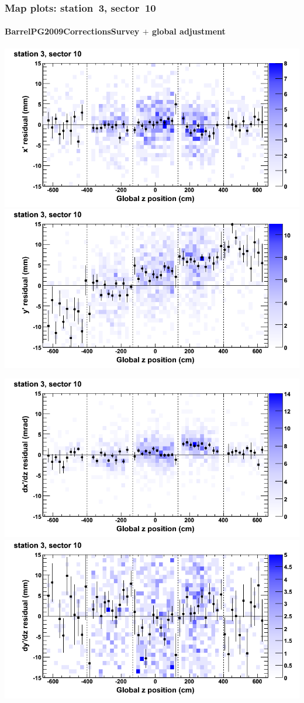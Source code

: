 \documentclass[compress]{beamer}
\begin{document}
\begin{frame}
\frametitle{Map plots: station~3, sector~10}
\framesubtitle{BarrelPG2009CorrectionsSurvey $+$ global adjustment}
\includegraphics[width=0.5\linewidth]{mapplots_re01/DTvsz_st3sec10_x.png}
\includegraphics[width=0.5\linewidth]{mapplots_re01/DTvsz_st3sec10_y.png}

\includegraphics[width=0.5\linewidth]{mapplots_re01/DTvsz_st3sec10_dxdz.png}
\includegraphics[width=0.5\linewidth]{mapplots_re01/DTvsz_st3sec10_dydz.png}
\end{frame}
\end{document}
